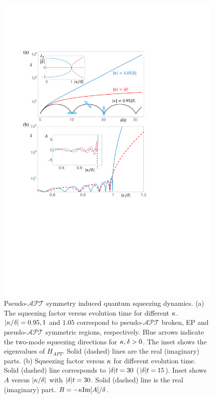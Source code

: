 \documentclass[twocolumn,prl,floatfix,citeautoscript,nofootinbib,superscriptaddress]{revtex4}
\begin{document}
\begin{figure}[t]
\includegraphics[width=1.0\linewidth]{Fig1.pdf}
\caption{Pseudo-$\mathcal{APT}$ symmetry induced quantum squeezing dynamics.
(a) The squeezing factor versus evolution time for different $\protect\kappa
$. $|\protect\kappa /\protect\delta |=0.95,1$ and $1.05$ correspond to
pseudo-$\mathcal{APT}$ broken, EP and pseudo-$\mathcal{APT}$ symmetric
regions, respectively. Blue arrows indicate the two-mode squeezing
directions for $\protect\kappa ,\protect\delta >0$. The inset shows the
eigenvalues of $H_{APT}$. Solid (dashed) lines are the real (imaginary)
parts. (b) Squeezing factor versus $\protect\kappa $ for different evolution
time. Solid (dashed) line corresponds to $|\protect\delta |t=30$ ($|\protect%
\delta |t=15$). Inset shows $A$ versus $|\protect\kappa /\protect\delta |$
with $|\protect\delta |t=30$. Solid (dashed) line is the real (imaginary)
part. $B=-{\protect\kappa }\mathrm{Im}[A]/{\protect\delta }$.}
\label{fig:1}
\end{figure}
\end{document}
